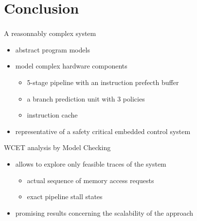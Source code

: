 \documentclass[usenames,dvipsnames]{beamer}
\begin{document}
  \section*{Conclusion}
  \begin{frame}
    \frametitle{\secname}
    \small

    \begin{block}{A reasonnably complex system}
    \begin{itemize}
      \item abstract program models %
      \item model complex hardware components
      \begin{itemize}
        \item 5-stage pipeline with an instruction prefecth buffer
        \item a branch prediction unit with 3 policies
        \item instruction cache
      \end{itemize}
      \item representative of a safety critical embedded control system

    \end{itemize}
    \end{block}
    
    \pause
    \begin{block}{WCET analysis by Model Checking}
    \begin{itemize}
      \item allows to explore only feasible traces of the system
      \begin{itemize}
        \item actual sequence of memory access requests
        \item exact pipeline stall states
      \end{itemize}
      \item promising results concerning the scalability of the approach
    \end{itemize}
    \end{block}
  \end{frame}
  
  
\end{document}
